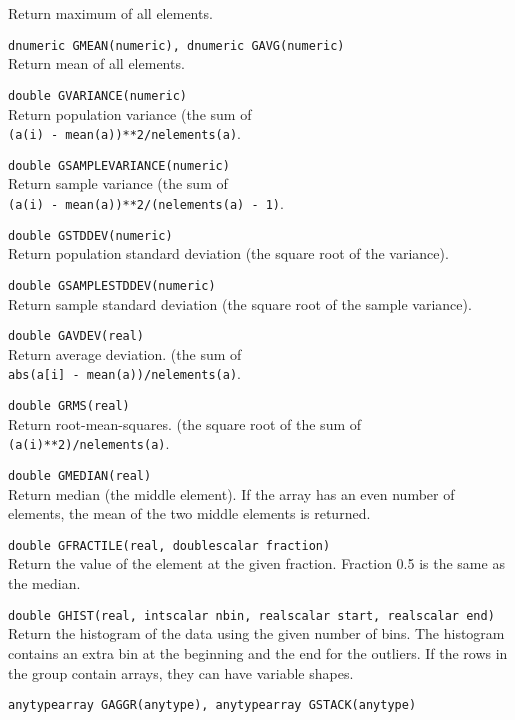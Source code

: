 \begin{description}
    Return maximum of all elements.
  \item[] \texttt{dnumeric GMEAN(numeric), dnumeric GAVG(numeric)}\\
    Return mean of all elements.
  \item[] \texttt{double GVARIANCE(numeric)}\\
    Return population variance (the sum of
    \\\texttt{(a(i) - mean(a))**2/nelements(a)}.
  \item[] \texttt{double GSAMPLEVARIANCE(numeric)}\\
    Return sample variance (the sum of
    \\\texttt{(a(i) - mean(a))**2/(nelements(a) - 1)}.
  \item[] \texttt{double GSTDDEV(numeric)}\\
    Return population standard deviation (the square root of the variance).
  \item[] \texttt{double GSAMPLESTDDEV(numeric)}\\
    Return sample standard deviation (the square root of the sample variance).
  \item[] \texttt{double GAVDEV(real)}\\
    Return average deviation. (the sum of
    \\\texttt{abs(a[i] - mean(a))/nelements(a)}.
  \item[] \texttt{double GRMS(real)}\\
    Return root-mean-squares. (the square root of the sum of
    \\\texttt{(a(i)**2)/nelements(a)}.
  \item[] \texttt{double GMEDIAN(real)}\\
    Return median (the middle element).
    If the array has an even number of elements, the mean of
    the two middle elements is returned.
  \item[] \texttt{double GFRACTILE(real, doublescalar fraction)}\\
    Return the value of the element at the given fraction.
    Fraction 0.5 is the same as the median.
  \item[] \texttt{double GHIST(real, intscalar nbin, realscalar start,
    realscalar end)}\\
    Return the histogram of the data using the given number of bins.
    The histogram contains an extra bin at the beginning and the end
    for the outliers. If the rows in the group contain arrays, they
    can have variable shapes.
  \item[] \texttt{anytypearray GAGGR(anytype), anytypearray GSTACK(anytype)}\\

\end{description}
